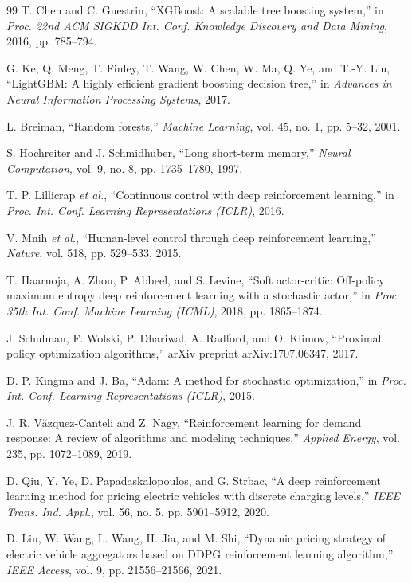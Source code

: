 \documentclass[10pt,journal]{IEEEtran}
\begin{document}
\begin{thebibliography}{99}
T. Chen and C. Guestrin,
``XGBoost: A scalable tree boosting system,''
in \emph{Proc. 22nd ACM SIGKDD Int. Conf. Knowledge Discovery and Data
Mining}, 2016, pp. 785--794.

G. Ke, Q. Meng, T. Finley, T. Wang, W. Chen, W. Ma, Q. Ye, and T.-Y. Liu,
``LightGBM: A highly efficient gradient boosting decision tree,''
in \emph{Advances in Neural Information Processing Systems}, 2017.

L. Breiman,
``Random forests,''
\emph{Machine Learning}, vol. 45, no. 1, pp. 5--32, 2001.

S. Hochreiter and J. Schmidhuber,
``Long short-term memory,''
\emph{Neural Computation}, vol. 9, no. 8, pp. 1735--1780, 1997.

T. P. Lillicrap \emph{et al.},
``Continuous control with deep reinforcement learning,''
in \emph{Proc. Int. Conf. Learning Representations (ICLR)}, 2016.

V. Mnih \emph{et al.},
``Human-level control through deep reinforcement learning,''
\emph{Nature}, vol. 518, pp. 529--533, 2015.

T. Haarnoja, A. Zhou, P. Abbeel, and S. Levine,
``Soft actor-critic: Off-policy maximum entropy deep reinforcement learning
with a stochastic actor,''
in \emph{Proc. 35th Int. Conf. Machine Learning (ICML)}, 2018,
pp. 1865--1874.

J. Schulman, F. Wolski, P. Dhariwal, A. Radford, and O. Klimov,
``Proximal policy optimization algorithms,''
arXiv preprint arXiv:1707.06347, 2017.

D. P. Kingma and J. Ba,
``Adam: A method for stochastic optimization,''
in \emph{Proc. Int. Conf. Learning Representations (ICLR)}, 2015.

J. R. V\u{a}zquez-Canteli and Z. Nagy,
``Reinforcement learning for demand response: A review of algorithms and
modeling techniques,''
\emph{Applied Energy}, vol. 235, pp. 1072--1089, 2019.

D. Qiu, Y. Ye, D. Papadaskalopoulos, and G. Strbac,
``A deep reinforcement learning method for pricing electric vehicles with
discrete charging levels,''
\emph{IEEE Trans. Ind. Appl.}, vol. 56, no. 5, pp. 5901--5912, 2020.

D. Liu, W. Wang, L. Wang, H. Jia, and M. Shi,
``Dynamic pricing strategy of electric vehicle aggregators based on DDPG
reinforcement learning algorithm,''
\emph{IEEE Access}, vol. 9, pp. 21556--21566, 2021.


\end{thebibliography}
\end{document}

